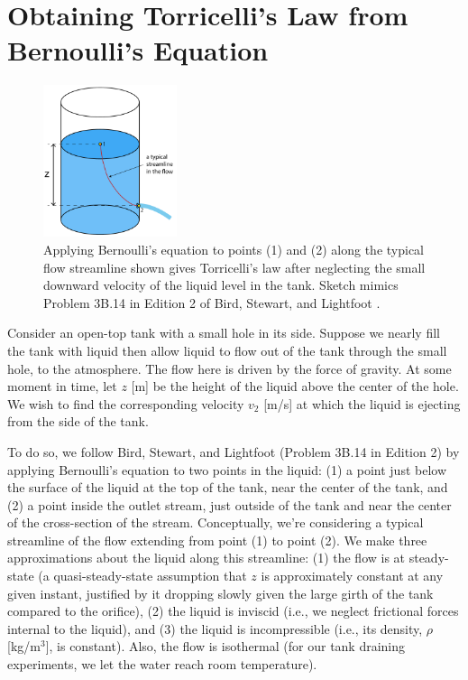 \documentclass[a4paper,fleqn]{cas-sc}
\begin{document}
\clearpage

\section{Obtaining Torricelli's Law from Bernoulli's Equation}
\label{sec:Torricelli}

\begin{figure}
	\centering
	\includegraphics[width=0.35\textwidth]{../drawings_and_photos/torricelli_illustration.pdf}
	\caption{Applying Bernoulli's equation to points (1) and (2) along the typical flow streamline shown gives Torricelli's law after neglecting the small downward velocity of the liquid level in the tank. Sketch mimics Problem 3B.14 in Edition 2 of Bird, Stewart, and Lightfoot \cite{bsl_book}.}
\end{figure}

	Consider an open-top tank with a small hole in its side. Suppose we nearly fill the tank with liquid then allow liquid to flow out of the tank through the small hole, to the atmosphere. The flow here is driven by the force of gravity.
	At some moment in time, let $z$ [m] be the height of the liquid above the center of the hole. 
	We wish to find the corresponding velocity $v_2$ [m/s] at which the liquid is ejecting from the side of the tank. 
	
	To do so, we follow Bird, Stewart, and Lightfoot \cite{bsl_book} (Problem 3B.14 in Edition 2) by applying Bernoulli's equation to two points in the liquid: 
	(1) a point just below the surface of the liquid at the top of the tank, near the center of the tank, and 
	(2) a point inside the outlet stream, just outside of the tank and near the center of the cross-section of the stream. 
	 Conceptually, we're considering a typical streamline of the flow extending from point (1) to point (2).
	We make three approximations about the liquid along this streamline: 
	(1) the flow is at steady-state (a quasi-steady-state assumption that $z$ is approximately constant at any given instant, justified by it dropping slowly given the large girth of the tank compared to the orifice),
	(2) the liquid is inviscid (i.e., we neglect frictional forces internal to the liquid),
	and
	(3) the liquid is incompressible (i.e., its density, $\rho$ [kg/m$^3$], is constant).
	Also, the flow is isothermal (for our tank draining experiments, we let the water reach room temperature).
	
\end{document}
